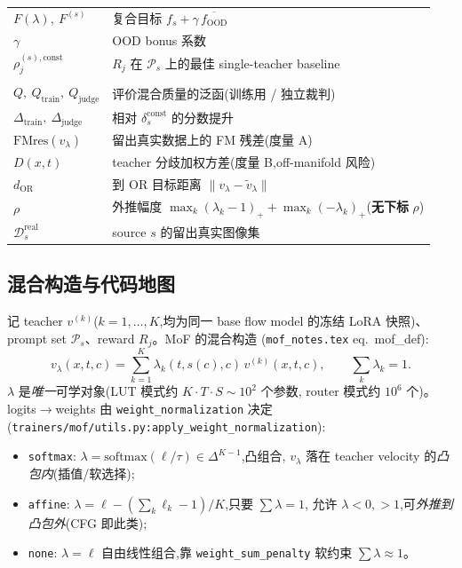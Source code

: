 \documentclass[11pt,a4paper]{article}
\newcommand{\softmax}{\mathrm{softmax}}
\newcommand{\OOD}{\mathrm{OOD}}
\newcommand{\const}{\mathrm{const}}
\newcommand{\dataD}{\mathcal{D}}
\theoremstyle{definition}
\begin{document}
\begin{center}
\begin{tabular}{@{}l@{\quad}p{11cm}@{}}
$F(\lambda),\ F^{(s)}$ & 复合目标 $f_s+\gamma\,\overline{f_{\OOD}}$\\
$\gamma$ & OOD bonus 系数\\
$\rho_j^{(s),\const}$ & $R_j$ 在 $\mathcal{P}_s$ 上的最佳 single-teacher baseline\\
\addlinespace
\multicolumn{2}{@{}l}{\textit{本文判据量}}\\
$Q,\ Q_{\text{train}},\ Q_{\text{judge}}$ & 评价混合质量的泛函(训练用 / 独立裁判)\\
$\Delta_{\text{train}},\ \Delta_{\text{judge}}$ & 相对 $\delta_s^{\const}$ 的分数提升\\
$\mathrm{FMres}(v_\lambda)$ & 留出真实数据上的 FM 残差(度量 A)\\
$D(x,t)$ & teacher 分歧加权方差(度量 B,off-manifold 风险)\\
$d_{\text{OR}}$ & 到 OR 目标距离 $\|v_\lambda-\tilde v_\lambda\|$\\
$\rho$ & 外推幅度 $\max_k(\lambda_k-1)_++\max_k(-\lambda_k)_+$(\textbf{无下标} $\rho$)\\
$\dataD_s^{\text{real}}$ & source $s$ 的留出真实图像集\\
\bottomrule
\end{tabular}
\end{center}

\subsection{混合构造与代码地图}
\label{ssec:construction}

记 teacher $v^{(k)}$($k=1,\ldots,K$,均为同一 base flow model 的冻结 LoRA
快照)、prompt set $\mathcal{P}_s$、reward $R_j$。MoF 的混合构造
(\texttt{mof\_notes.tex} eq.~mof\_def):
\begin{equation}
v_\lambda(x,t,c) = \sum_{k=1}^{K} \lambda_k(t, s(c), c)\, v^{(k)}(x,t,c),
\qquad \textstyle\sum_k \lambda_k = 1.
\label{eq:mof}
\end{equation}
$\lambda$ 是\emph{唯一}可学对象(LUT 模式约 $K{\cdot}T{\cdot}S\sim 10^2$ 个参数,
router 模式约 $10^6$ 个)。logits$\to$weights 由 \texttt{weight\_normalization} 决定
(\texttt{trainers/mof/utils.py:apply\_weight\_normalization}):
\begin{itemize}[leftmargin=1.5em]
\item \texttt{softmax}: $\lambda=\softmax(\ell/\tau)\in\Delta^{K-1}$,凸组合,
$v_\lambda$ 落在 teacher velocity 的\emph{凸包内}(插值/软选择);
\item \texttt{affine}: $\lambda=\ell-(\sum_k\ell_k-1)/K$,只要 $\sum\lambda=1$,
允许 $\lambda<0,>1$,可\emph{外推到凸包外}(CFG 即此类);
\item \texttt{none}: $\lambda=\ell$ 自由线性组合,靠 \texttt{weight\_sum\_penalty}
软约束 $\sum\lambda\approx 1$。
\end{itemize}
\end{document}
